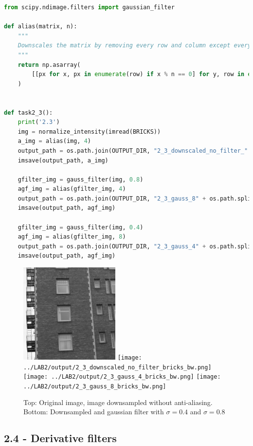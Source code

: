 \begin{lstlisting}[language=Python, label=anti_aliasing_filter, caption=Gaussian anti-aliasing filter]
from scipy.ndimage.filters import gaussian_filter

def alias(matrix, n):
    """
    Downscales the matrix by removing every row and column except every nth.
    """
    return np.asarray(
        [[px for x, px in enumerate(row) if x % n == 0] for y, row in enumerate(matrix) if y % n == 0]
    )


def task2_3():
    print('2.3')
    img = normalize_intensity(imread(BRICKS))
    a_img = alias(img, 4)
    output_path = os.path.join(OUTPUT_DIR, "2_3_downscaled_no_filter_" + os.path.split(BRICKS)[-1])
    imsave(output_path, a_img)

    gfilter_img = gauss_filter(img, 0.8)
    agf_img = alias(gfilter_img, 4)
    output_path = os.path.join(OUTPUT_DIR, "2_3_gauss_8" + os.path.split(BRICKS)[-1])
    imsave(output_path, agf_img)

    gfilter_img = gauss_filter(img, 0.4)
    agf_img = alias(gfilter_img, 8)
    output_path = os.path.join(OUTPUT_DIR, "2_3_gauss_4" + os.path.split(BRICKS)[-1])
    imsave(output_path, agf_img)
\end{lstlisting}

\newpage
\begin{figure}[h!]
    \centering
    \includegraphics[width=5cm]{../LAB2/img/bricks_bw.png}
    \texttt{[image: ../LAB2/output/2\_3\_downscaled\_no\_filter\_bricks\_bw.png]} \\
    \texttt{[image: ../LAB2/output/2\_3\_gauss\_4\_bricks\_bw.png]}
    \texttt{[image: ../LAB2/output/2\_3\_gauss\_8\_bricks\_bw.png]}
    \caption{Top: Original image, image downsampled without anti-aliasing. \\ Bottom: Downsampled and gaussian filter with $\sigma = 0.4$ and $\sigma = 0.8$}
    \label{gaussian_anti_aliasing_filter_results}
\end{figure}

\newpage
\subsection*{2.4 - Derivative filters}

